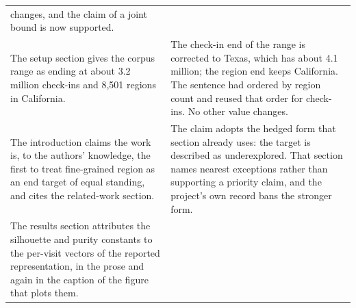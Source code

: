 \begin{table}[htb]
\begin{tabular}{@{}p{}p{}@{}}
changes, and the claim of a joint bound is now supported. \\
\addlinespace
The setup section gives the corpus range as ending at about
3.2 million check-ins and 8,501 regions in California. &
The check-in end of the range is corrected to Texas, which has
about 4.1 million; the region end keeps California. The
sentence had ordered by region count and reused that order for
check-ins. No other value changes. \\
\addlinespace
The introduction claims the work is, to the authors'
knowledge, the first to treat fine-grained region as an end
target of equal standing, and cites the related-work section. &
The claim adopts the hedged form that section already uses:
the target is described as underexplored. That section names
nearest exceptions rather than supporting a priority claim, and
the project's own record bans the stronger form. \\
\addlinespace
The results section attributes the silhouette and purity
constants to the per-visit vectors of the reported
representation, in the prose and again in the caption of the
figure that plots them. &

\end{tabular}
\end{table}
